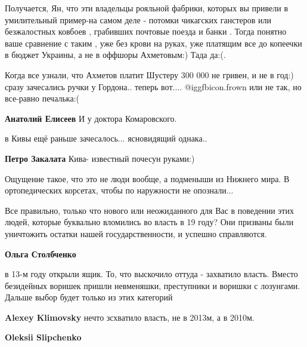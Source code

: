\begin{itemize}
\begin{itemize}
\end{itemize} %


Получается, Ян, что эти владельцы рояльной фабрики, которых вы привели в
умилительный пример-на самом деле - потомки чикагских ганстеров или
безжалостных ковбоев , грабивших почтовые поезда и банки . Тогда понятно ваше
сравнение с таким , уже без крови на руках, уже платящим все до копеечки в
бюджет Украины, а не в оффшоры Ахметовым:) Тада да:(.



Когда все узнали, что Ахметов платит Шустеру 300 000 не гривен, и не в год:)
сразу зачесались ручки у Гордона.. теперь вот.... @igg{fbicon.frown}  или не так, но все-равно
печалька:(

\begin{itemize} %
\textbf{Анатолий Елисеев} И у доктора Комаровского.

в Кивы ещё раньше зачесалось... ясновидящий однака..

\textbf{Петро Закалата} Кива- известный почесун руками:)
\end{itemize} %


Ощущение такое, что это не люди вообще, а подменыши из Нижнего мира. В
ортопедических корсетах, чтобы по наружности не опознали...


Все правильно, только что нового или неожиданного для Вас в поведении этих
людей, которые буквально вломились во власть в 19 году? Они призваны были
уничтожить остатки нашей государственности, и успешно справляются.

\begin{itemize} %


\textbf{Ольга Столбченко} 

в 13-м году открыли ящик.
То, что выскочило оттуда - захватило власть.
Вместо безидейных воришек пришли невменяшки, преступники и воришки с лозунгами.
Дальше выбор будет только из этих категорий

\textbf{Alexey Klimovsky} нечто зсхватило власть, не в 2013м, а в 2010м.

\textbf{Oleksii Slipchenko} 


\end{itemize}
\end{itemize}
